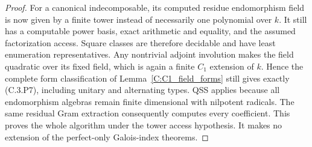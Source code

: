 \begin{proof}
For a canonical indecomposable, its computed residue
endomorphism field is now given by a finite tower
instead of necessarily one polynomial over $k$.
It still has a computable power basis, exact
arithmetic and equality, and the assumed factorization
access. Square classes are therefore decidable and
have least enumeration representatives.
Any nontrivial adjoint involution makes the field
quadratic over its fixed field, which is again
a finite $C_1$ extension of $k$. Hence the complete
form classification of Lemma~\ref{C:C1_field_forms}
still gives exactly (C.3.P7), including unitary
and alternating types. QSS applies because all
endomorphism algebras remain finite dimensional
with nilpotent radicals. The same residual Gram
extraction consequently computes every coefficient.
This proves the whole algorithm under the tower
access hypothesis. It makes no extension of
the perfect-only Galois-index theorems.
\end{proof}
